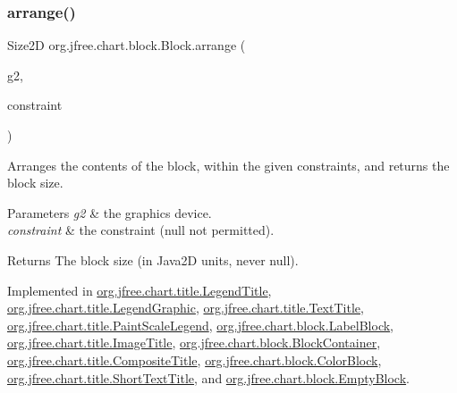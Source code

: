 \subsubsection{\texorpdfstring{arrange()}{arrange()}\hspace{0.1cm}{\footnotesize\ttfamily [2/2]}}
{\footnotesize\ttfamily Size2D org.\+jfree.\+chart.\+block.\+Block.\+arrange (\begin{DoxyParamCaption}\item[{Graphics2D}]{g2,  }\item[{\mbox{\hyperlink{classorg_1_1jfree_1_1chart_1_1block_1_1_rectangle_constraint}{Rectangle\+Constraint}}}]{constraint }\end{DoxyParamCaption})}

Arranges the contents of the block, within the given constraints, and returns the block size.


\begin{DoxyParams}{Parameters}
{\em g2} & the graphics device. \\
\hline
{\em constraint} & the constraint ({\ttfamily null} not permitted).\\
\hline
\end{DoxyParams}
\begin{DoxyReturn}{Returns}
The block size (in Java2D units, never {\ttfamily null}). 
\end{DoxyReturn}


Implemented in \mbox{\hyperlink{classorg_1_1jfree_1_1chart_1_1title_1_1_legend_title_a2495bc37b4b9f15e00280185d2de63f4}{org.\+jfree.\+chart.\+title.\+Legend\+Title}}, \mbox{\hyperlink{classorg_1_1jfree_1_1chart_1_1title_1_1_legend_graphic_ae60f43bb510f5553a4ee11178030eb68}{org.\+jfree.\+chart.\+title.\+Legend\+Graphic}}, \mbox{\hyperlink{classorg_1_1jfree_1_1chart_1_1title_1_1_text_title_ab3eccb24ba6a7c3f411d86001f17e1e0}{org.\+jfree.\+chart.\+title.\+Text\+Title}}, \mbox{\hyperlink{classorg_1_1jfree_1_1chart_1_1title_1_1_paint_scale_legend_a893860f6362afa2f5e22dd1b0ff301f7}{org.\+jfree.\+chart.\+title.\+Paint\+Scale\+Legend}}, \mbox{\hyperlink{classorg_1_1jfree_1_1chart_1_1block_1_1_label_block_afdb9ca1eaacea8719e9ff9fa30f14e1a}{org.\+jfree.\+chart.\+block.\+Label\+Block}}, \mbox{\hyperlink{classorg_1_1jfree_1_1chart_1_1title_1_1_image_title_a6fcab813990b8e21fd307a2e6a7d0475}{org.\+jfree.\+chart.\+title.\+Image\+Title}}, \mbox{\hyperlink{classorg_1_1jfree_1_1chart_1_1block_1_1_block_container_af4746269c5628f6ae1ce2be343e5b1e6}{org.\+jfree.\+chart.\+block.\+Block\+Container}}, \mbox{\hyperlink{classorg_1_1jfree_1_1chart_1_1title_1_1_composite_title_a9f7d9c67faefcc8745d73da575bf731f}{org.\+jfree.\+chart.\+title.\+Composite\+Title}}, \mbox{\hyperlink{classorg_1_1jfree_1_1chart_1_1block_1_1_color_block_a0fc4c45fb677dc2f062fae9f5d4656e0}{org.\+jfree.\+chart.\+block.\+Color\+Block}}, \mbox{\hyperlink{classorg_1_1jfree_1_1chart_1_1title_1_1_short_text_title_aed42f3ff529f06abb2bc28f0ed8e15a9}{org.\+jfree.\+chart.\+title.\+Short\+Text\+Title}}, and \mbox{\hyperlink{classorg_1_1jfree_1_1chart_1_1block_1_1_empty_block_adf2baca7ef56fa857a0874f08e029a74}{org.\+jfree.\+chart.\+block.\+Empty\+Block}}.

